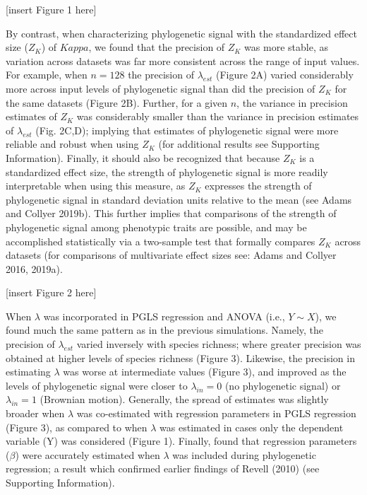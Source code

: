\documentclass[
]{article}
\begin{document}
{[}insert Figure 1 here{]} \hfill\break

By contrast, when characterizing phylogenetic signal with the
standardized effect size (\(Z_K\)) of \(Kappa\), we found that the
precision of \(Z_K\) was more stable, as variation across datasets was
far more consistent across the range of input values. For example, when
\(n=128\) the precision of \(\lambda_{est}\) (Figure 2A) varied
considerably more across input levels of phylogenetic signal than did
the precision of \(Z_K\) for the same datasets (Figure 2B). Further, for
a given \(n\), the variance in precision estimates of \(Z_K\) was
considerably smaller than the variance in precision estimates of
\(\lambda_{est}\) (Fig. 2C,D); implying that estimates of phylogenetic
signal were more reliable and robust when using \(Z_K\) (for additional
results see Supporting Information). Finally, it should also be
recognized that because \(Z_K\) is a standardized effect size, the
strength of phylogenetic signal is more readily interpretable when using
this measure, as \(Z_K\) expresses the strength of phylogenetic signal
in standard deviation units relative to the mean (see Adams and Collyer
2019b). This further implies that comparisons of the strength of
phylogenetic signal among phenotypic traits are possible, and may be
accomplished statistically via a two-sample test that formally compares
\(Z_K\) across datasets (for comparisons of multivariate effect sizes
see: Adams and Collyer 2016, 2019a). \hfill\break

{[}insert Figure 2 here{]} \hfill\break 

When \(\lambda\) was incorporated in PGLS regression and ANOVA (i.e.,
\(Y\sim{X}\)), we found much the same pattern as in the previous
simulations. Namely, the precision of \(\lambda_{est}\) varied inversely
with species richness; where greater precision was obtained at higher
levels of species richness (Figure 3). Likewise, the precision in
estimating \(\lambda\) was worse at intermediate values (Figure 3), and
improved as the levels of phylogenetic signal were closer to
\(\lambda_{in}=0\) (no phylogenetic signal) or \(\lambda_{in}=1\)
(Brownian motion). Generally, the spread of estimates was slightly
broader when \(\lambda\) was co-estimated with regression parameters in
PGLS regression (Figure 3), as compared to when \(\lambda\) was
estimated in cases only the dependent variable (Y) was considered
(Figure 1). Finally, found that regression parameters (\(\beta\)) were
accurately estimated when \(\lambda\) was included during phylogenetic
regression; a result which confirmed earlier findings of Revell (2010)
(see Supporting Information). \hfill\break
\end{document}
